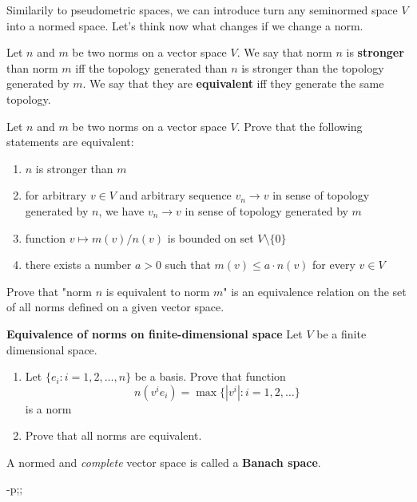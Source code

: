 Similarily to pseudometric spaces, we can introduce turn any seminormed space $V$ into a normed space. Let's think now what changes if we change a norm.

\begin{definition}
  Let $n$ and $m$ be two norms on a vector space $V$. We say that norm $n$ is \textbf{stronger} than norm $m$ iff the topology generated than $n$ is stronger than the
  topology generated by $m$. We say that they are \textbf{equivalent} iff they generate the same topology.
\end{definition}

\begin{exercise}
  Let $n$ and $m$ be two norms on a vector space $V$. Prove that the following statements are equivalent:
  \begin{enumerate}
    \item $n$ is stronger than $m$
    \item for arbitrary $v\in V$ and arbitrary sequence $v_n\to v$ in sense of topology generated by $n$, we have $v_n\to v$ in sense of topology generated by $m$
    \item function $v\mapsto m(v)/n(v)$ is bounded on set $V\setminus\{0\}$
    \item there exists a number $a>0$ such that $m(v)\le a\cdot n(v)$ for every $v\in V$
  \end{enumerate}
\end{exercise}

\begin{exercise}
  Prove that "norm $n$ is equivalent to norm $m$" is an equivalence relation on the set of all norms defined on a given vector space.
\end{exercise}

\begin{exercise}
  \textbf{Equivalence of norms on finite-dimensional space}
  Let $V$ be a finite dimensional space.
  \begin{enumerate}
    \item Let $\{e_i: i=1,2,\dots,n\}$ be a basis. Prove that function
      $$n(v^ie_i)=\max \{|v^i| : i=1,2,\dots\}$$
        is a norm
    \item Prove that all norms are equivalent.
  \end{enumerate}
\end{exercise}

\begin{definition}
  A normed and \emph{complete} vector space is called a \textbf{Banach space}.
\end{definition}-p;;
